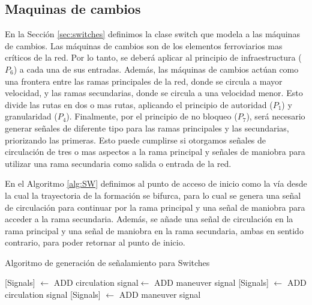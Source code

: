 \subsection{Maquinas de cambios}
	\label{sec:signal_switches}
	
    
    En la Sección \ref{sec:switches} definimos la clase switch que modela a las máquinas de cambios. Las máquinas de cambios son de los elementos ferroviarios mas críticos de la red. Por lo tanto, se deberá aplicar al principio de infraestructura ($P_6$) a cada una de sus entradas. Además, las máquinas de cambios actúan como una frontera entre las ramas principales de la red, donde se circula a mayor velocidad, y las ramas secundarias, donde se circula a una velocidad menor. Esto divide las rutas en dos o mas rutas, aplicando el principio de autoridad ($P_1$) y granularidad ($P_4$). Finalmente, por el principio de no bloqueo ($P_7$), será necesario generar señales de diferente tipo para las ramas principales y las secundarias, priorizando las primeras. Esto puede cumplirse si otorgamos señales de circulación de tres o mas aspectos a la rama principal y señales de maniobra para utilizar una rama secundaria como salida o entrada de la red.
    
    En el Algoritmo \ref{alg:SW} definimos al punto de acceso de inicio como la vía desde la cual la trayectoria de la formación se bifurca, para lo cual se genera una señal de circulación para continuar por la rama principal y una señal de maniobra para acceder a la rama secundaria. Además, se añade una señal de circulación en la rama principal y una señal de maniobra en la rama secundaria, ambas en sentido contrario, para poder retornar al punto de inicio. 
    
    \begin{algorithm}[hbt!]
        \caption{Algoritmo de generación de señalamiento para Switches}\label{alg:SW}
        \DontPrintSemicolon
        \SetNoFillComment
        \LinesNotNumbered 
        {
            {
                {
                    [Signals] $\gets$ ADD circulation signal\;
                    [Signals] $\gets$ ADD maneuver signal\;
                }
                {
                    [Signals] $\gets$ ADD circulation signal\;
                }
                {
                    [Signals] $\gets$ ADD maneuver signal\;
                }
            }   
        }
        \KwResult{[Signals]} 
    \end{algorithm}

